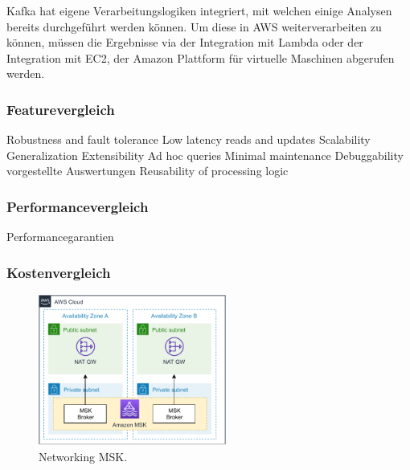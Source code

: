 Kafka hat eigene Verarbeitungslogiken integriert, mit welchen einige Analysen bereits durchgeführt werden können. Um diese in \ac{AWS} weiterverarbeiten zu können, müssen die Ergebnisse via der Integration mit Lambda oder der Integration mit \ac{EC2}, der Amazon Plattform für virtuelle Maschinen abgerufen werden.

\subsubsection{Featurevergleich} 
Robustness and fault tolerance
Low latency reads and updates
Scalability
Generalization
Extensibility
Ad hoc queries
Minimal maintenance
Debuggability
vorgestellte Auswertungen 
Reusability of processing logic

\subsubsection{Performancevergleich}
Performancegarantien

\subsubsection{Kostenvergleich}
\begin{figure}[H]
\centering
\includegraphics[width=0.55\textwidth]{graphics/MSK-Networking.pdf}
\caption[Networking MSK]{Networking MSK.\footnotemark}
\label{abb:NetworkingMSK}
\end{figure}

